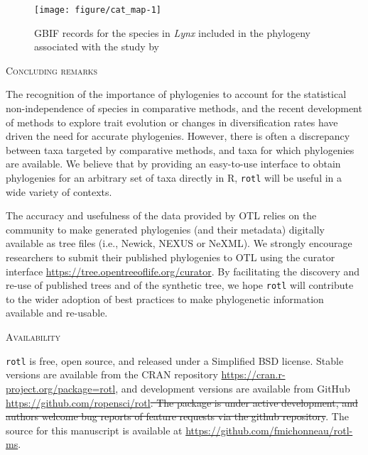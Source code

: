 \documentclass[12pt,letterpaper]{article}\usepackage[]{graphicx}\usepackage[]{color}
\makeatletter
\def\maxwidth{ %
  \ifdim\Gin@nat@width>\linewidth
    \linewidth
  \else
    \Gin@nat@width
  \fi
}
\newenvironment{knitrout}{}{} %
\renewcommand{\section}[1]{%
\bigskip
\begin{center}
\begin{Large}
\normalfont\scshape #1
\medskip
\end{Large}
\end{center}}
\providecommand{\DIFdeltex}[1]{{\protect\color{red}\sout{#1}}}                      %
\providecommand{\DIFdelbegin}{} %
\providecommand{\DIFdelend}{} %
\providecommand{\DIFdel}[1]{\texorpdfstring{\DIFdeltex{#1}}{}} %
\makeatother
\begin{document}
\begin{knitrout}\small
{}\color{fgcolor}\begin{figure}
\texttt{[image: figure/cat\_map-1]} \caption[GBIF records for the species in \textit{Lynx} included in the phylogeny associated with the study by \citealt{Johnson2006}]{GBIF records for the species in \textit{Lynx} included in the phylogeny associated with the study by \citealt{Johnson2006}}\label{fig:cat_map}
\end{figure}


\end{knitrout}



\section{Concluding remarks}
\label{sec:conclusion}

The recognition of the importance of phylogenies to account for the statistical
non-independence of species in comparative methods, and the recent development
of methods to explore trait evolution or changes in diversification rates have
driven the need for accurate phylogenies. However, there is often a discrepancy
between taxa targeted by comparative methods, and taxa for which phylogenies are
available. We believe that by providing an easy-to-use interface to obtain
phylogenies for an arbitrary set of taxa directly in R, \texttt{rotl} will be
useful in a wide variety of contexts.

The accuracy and usefulness of the data provided by OTL relies on the community
to make generated phylogenies (and their metadata) digitally available as tree
files (i.e., Newick, NEXUS or NeXML). We strongly encourage researchers to
submit their published phylogenies to OTL using the curator interface
\url{https://tree.opentreeoflife.org/curator}. By facilitating the discovery and
re-use of published trees and of the synthetic tree, we hope \texttt{rotl} will
contribute to the wider adoption of best practices to make phylogenetic
information available and re-usable.


\section{Availability}
\label{sec:availability}

\texttt{rotl} is free, open source, and released under a Simplified
BSD license. Stable versions are available from the CRAN repository
\url{https://cran.r-project.org/package=rotl}, and development
versions are available from GitHub
\url{https://github.com/ropensci/rotl}\DIFdelbegin \DIFdel{. The package is under active development,
and authors welcome bug reports of feature requests via the github repository}\DIFdelend . The source for this manuscript is
available at \url{https://github.com/fmichonneau/rotl-ms}.
\end{document}
